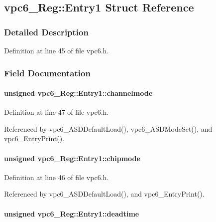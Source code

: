 \subsection{vpc6\_\-Reg::Entry1 Struct Reference}
\label{structvpc6__Reg_1_1Entry1}


\subsubsection{Detailed Description}


Definition at line 45 of file vpc6.h.

\subsubsection{Field Documentation}
\paragraph[{channelmode}]{\setlength{\rightskip}{0pt plus 5cm}unsigned {\bf vpc6\_\-Reg::Entry1::channelmode}}\hfill\label{structvpc6__Reg_1_1Entry1_af2d9892ec61b86e1ae7996d97c063b8a}


Definition at line 47 of file vpc6.h.

Referenced by vpc6\_\-ASDDefaultLoad(), vpc6\_\-ASDModeSet(), and vpc6\_\-EntryPrint().
\paragraph[{chipmode}]{\setlength{\rightskip}{0pt plus 5cm}unsigned {\bf vpc6\_\-Reg::Entry1::chipmode}}\hfill\label{structvpc6__Reg_1_1Entry1_a13049b2766a30e759bd660ba19eadd70}


Definition at line 46 of file vpc6.h.

Referenced by vpc6\_\-ASDDefaultLoad(), and vpc6\_\-EntryPrint().
\paragraph[{deadtime}]{\setlength{\rightskip}{0pt plus 5cm}unsigned {\bf vpc6\_\-Reg::Entry1::deadtime}}\hfill\label{structvpc6__Reg_1_1Entry1_ae228b78acb62fefe3976eec5b25ad016}


